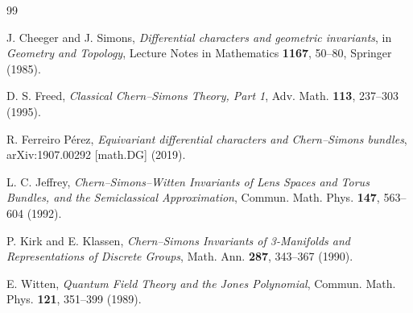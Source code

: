 \documentclass[11pt,a4paper]{article}
\begin{document}
\begin{thebibliography}{99}

J. Cheeger and J. Simons,
\textit{Differential characters and geometric invariants},
in \textit{Geometry and Topology}, Lecture Notes in Mathematics \textbf{1167}, 50--80,
Springer (1985).

D. S. Freed,
\textit{Classical Chern--Simons Theory, Part 1},
Adv. Math. \textbf{113}, 237--303 (1995).

R. Ferreiro Pérez,
\textit{Equivariant differential characters and Chern--Simons bundles},
arXiv:1907.00292 [math.DG] (2019).

L. C. Jeffrey,
\textit{Chern--Simons--Witten Invariants of Lens Spaces and Torus Bundles, and the Semiclassical Approximation},
Commun. Math. Phys. \textbf{147}, 563--604 (1992).

P. Kirk and E. Klassen,
\textit{Chern--Simons Invariants of 3-Manifolds and Representations of Discrete Groups},
Math. Ann. \textbf{287}, 343--367 (1990).

E. Witten,
\textit{Quantum Field Theory and the Jones Polynomial},
Commun. Math. Phys. \textbf{121}, 351--399 (1989).

\end{thebibliography}
\end{document}
